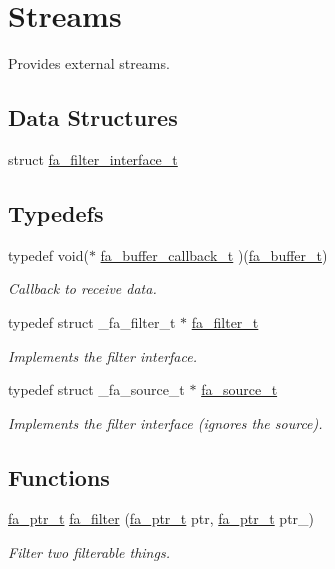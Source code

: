 \hypertarget{group___fa_streams}{\section{Streams}
\label{group___fa_streams}
}


Provides external streams.  


\subsection*{Data Structures}
\begin{DoxyCompactItemize}
\item 
struct \hyperlink{structfa__filter__interface__t}{fa\-\_\-filter\-\_\-interface\-\_\-t}
\end{DoxyCompactItemize}
\subsection*{Typedefs}
\begin{DoxyCompactItemize}
\item 
typedef void($\ast$ \hyperlink{group___fa_streams_ga9f9c29b1d06e16f886e1458cbf3d827f}{fa\-\_\-buffer\-\_\-callback\-\_\-t} )(\hyperlink{group___fa_buffer_ga0ed7a1d783ab322e2e8be02432d0839e}{fa\-\_\-buffer\-\_\-t})
\begin{DoxyCompactList}\small\item\em Callback to receive data. \end{DoxyCompactList}\item 
typedef struct \-\_\-fa\-\_\-filter\-\_\-t $\ast$ \hyperlink{group___fa_streams_ga5d565d001005952a789cb9c7b3404f7e}{fa\-\_\-filter\-\_\-t}
\begin{DoxyCompactList}\small\item\em Implements the filter interface. \end{DoxyCompactList}\item 
typedef struct \-\_\-fa\-\_\-source\-\_\-t $\ast$ \hyperlink{group___fa_streams_ga7c5db08c833038bdbec81bf266c7f6f4}{fa\-\_\-source\-\_\-t}
\begin{DoxyCompactList}\small\item\em Implements the filter interface (ignores the source). \end{DoxyCompactList}\end{DoxyCompactItemize}
\subsection*{Functions}
\begin{DoxyCompactItemize}
\item 
\hyperlink{group___fa_ga915ddeae99ad7568b273d2b876425197}{fa\-\_\-ptr\-\_\-t} \hyperlink{group___fa_streams_gad7bcf3fadea6d6f55bd4941c348193ff}{fa\-\_\-filter} (\hyperlink{group___fa_ga915ddeae99ad7568b273d2b876425197}{fa\-\_\-ptr\-\_\-t} ptr, \hyperlink{group___fa_ga915ddeae99ad7568b273d2b876425197}{fa\-\_\-ptr\-\_\-t} ptr\-\_\-)
\begin{DoxyCompactList}\small\item\em Filter two filterable things. \end{DoxyCompactList}\end{DoxyCompactItemize}


